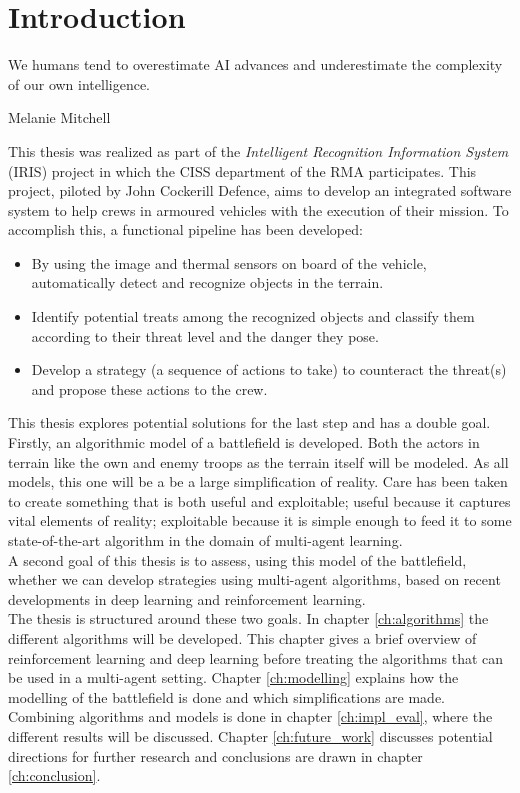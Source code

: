 \chapter{Introduction}

\epigraph{We humans tend to overestimate AI advances and underestimate the complexity of our own intelligence.} {Melanie Mitchell}
This thesis was realized as part of the \emph{Intelligent Recognition Information System} (IRIS) project in which the CISS department of the RMA participates. This project, piloted by John Cockerill Defence, aims to develop an integrated software system to help crews in armoured vehicles with the execution of their mission. To accomplish this, a functional pipeline has been developed:
\begin{itemize}
    \item By using the image and thermal sensors on board of the vehicle, automatically detect and recognize objects in the terrain.
    \item Identify potential treats among the recognized objects and classify them according to their threat level and the danger they pose.
    \item Develop a strategy (a sequence of actions to take) to counteract the threat(s) and propose these actions to the crew.
\end{itemize}
This thesis explores potential solutions for the last step and has a double goal.\\
Firstly, an algorithmic model of a battlefield is developed. Both the actors in terrain like the own and enemy troops as the terrain itself will be modeled. As all models, this one will be a be a large simplification of reality.  Care has been taken to create something that is both useful and exploitable; useful because it captures vital elements of reality; exploitable because it is simple enough to feed it to some state-of-the-art algorithm in the domain of multi-agent learning.\\
A second goal of this thesis is to assess, using this model of the battlefield, whether we can develop strategies using multi-agent algorithms, based on recent developments in deep learning and reinforcement learning.\\
The thesis is structured around these two goals. In chapter \ref{ch:algorithms} the different algorithms will be developed. This chapter gives a brief overview of reinforcement learning and deep learning before treating the algorithms that can be used in a multi-agent setting. Chapter \ref{ch:modelling} explains how the modelling of the battlefield is done and which simplifications are made. Combining algorithms and models is done in chapter \ref{ch:impl_eval}, where the different results will be discussed. Chapter \ref{ch:future_work} discusses potential directions for further research and conclusions are drawn in chapter \ref{ch:conclusion}.

